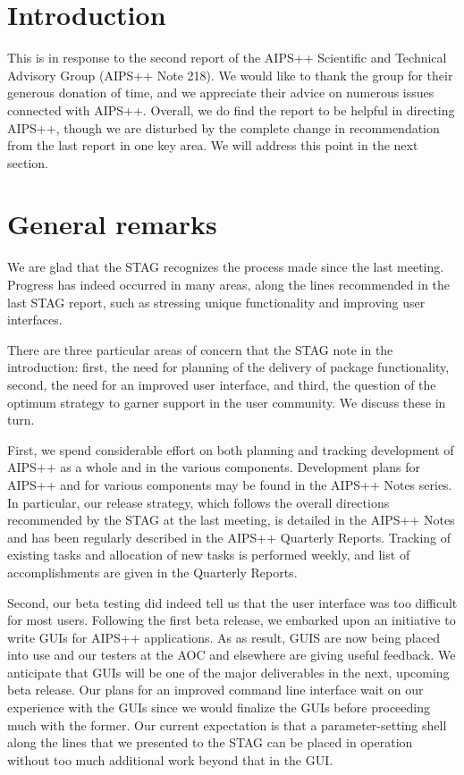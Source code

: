 \section{Introduction}

This is in response to the second report of the AIPS++ Scientific and
Technical Advisory Group (AIPS++ Note 218). We would like to thank the
group for their generous donation of time, and we appreciate their
advice on numerous issues connected with AIPS++. Overall, we do find
the report to be helpful in directing AIPS++, though we are disturbed
by the complete change in recommendation from the last report in one
key area. We will address this point in the next section.

\section{General remarks}

We are glad that the STAG recognizes the process made since the last
meeting. Progress has indeed occurred in many areas, along the lines
recommended in the last STAG report, such as stressing unique
functionality and improving user interfaces. 

There are three particular areas of concern that the STAG note in the
introduction: first, the need for planning of the delivery of package
functionality, second, the need for an improved user interface, and
third, the question of the optimum strategy to garner support in the
user community. We discuss these in turn.

First, we spend considerable effort on both planning and tracking
development of AIPS++ as a whole and in the various
components. Development plans for AIPS++ and for various components
may be found in the AIPS++ Notes series. In particular, our release
strategy, which follows the overall directions recommended by the STAG
at the last meeting, is detailed in the AIPS++ Notes and has been
regularly described in the AIPS++ Quarterly Reports. Tracking of
existing tasks and allocation of new tasks is performed weekly, and
list of accomplishments are given in the Quarterly Reports.

Second, our beta testing did indeed tell us that the user interface
was too difficult for most users. Following the first beta release, we
embarked upon an initiative to write GUIs for AIPS++ applications. As
as result, GUIS are now being placed into use and our testers at the
AOC and elsewhere are giving useful feedback. We anticipate that GUIs
will be one of the major deliverables in the next, upcoming beta
release. Our plans for an improved command line interface wait on our
experience with the GUIs since we would finalize the GUIs before
proceeding much with the former. Our current expectation is that a
parameter-setting shell along the lines that we presented to the STAG
can be placed in operation without too much additional work beyond
that in the GUI.

